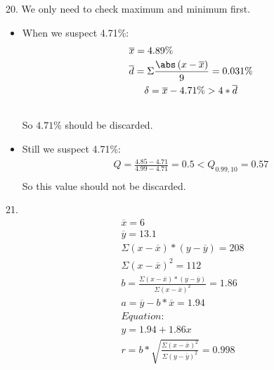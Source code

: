 \documentclass{article}
\begin{document}
20. We only need to check maximum and minimum first.\\
\begin{itemize}
    \item 
    When we suspect 4.71\%:\\
    \begin{equation}
        \begin{multlined}
            \overline{x} = 4.89\%\\
            \overline{d} = \Sigma\frac{\abs\left(x - \overline{x}\right)}{9} = 0.031\%\\
            \delta = \overline{x} - 4.71\% > 4*\overline{d}\\
        \end{multlined}
    \end{equation}
    So $4.71\%$ should be discarded.\\
    \item
    Still we suspect 4.71\%:\\
    \begin{equation}
        \begin{multlined}
            Q = \frac{4.85 - 4.71}{4.99 - 4.71} = 0.5 < Q_{0.99, 10} = 0.57\\
        \end{multlined}
    \end{equation}
    So this value should not be discarded.\\
\end{itemize}
21.\begin{equation}
    \begin{multlined}
        \overline{x} = 6\\
        \overline{y} = 13.1\\
        \Sigma\left(x - \overline{x}\right)*\left(y - \overline{y}\right) = 208\\
        \Sigma\left(x - \overline{x}\right)^2 = 112\\
        b = \frac{\Sigma\left(x - \overline{x}\right)*\left(y - \overline{y}\right)}{\Sigma\left(x - \overline{x}\right)^2} = 1.86\\
        a = \overline{y} - b*\overline{x} = 1.94\\
        Equation:\\
        y = 1.94+1.86x\\
        r = b*\sqrt{\frac{\Sigma\left(x - \overline{x}\right)^2}{\Sigma\left(y - \overline{y}\right)^2}} = 0.998\\
    \end{multlined}
\end{equation}
\end{document}
